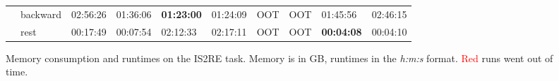 \begin{figure}[H]
{\begin{tabular}{ll|l|l|l|l|l|l|l|l|}
    \multicolumn{1}{|l|}{}                          & backward    & 02:56:26 & 01:36:06 & \textbf{01:23:00} & 01:24:09 & \scriptsize OOT   & \scriptsize OOT      & 01:45:56 & 02:46:15    \\ \cline{2-10} 
    \multicolumn{1}{|l|}{}                          & rest        & 00:17:49 & 00:07:54 & 02:12:33 & 02:17:11 & \scriptsize OOT   & \scriptsize OOT      & \textbf{00:04:08} & 00:04:10    \\ \hline
    \end{tabular}}

    \captionsetup{width=\dimexpr\textwidth-1.5cm\relax}
    \caption{Memory consumption and runtimes on the IS2RE task. Memory is in GB, runtimes in the \textit{h:m:s} format.
    \textcolor{red}{Red} runs went out of time.}
    

\end{figure}

